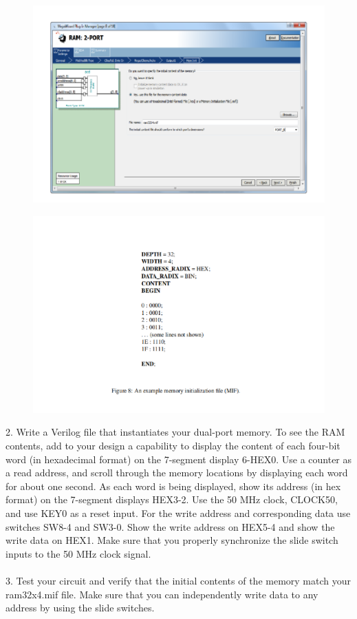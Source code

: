 \begin{figure}[h]
    \centering
    \includegraphics[scale = 0.4]{source/picture/Lab8/bai8_minhhoa3.png}
\end{figure}
\newpage
\begin{figure}[h]
    \centering
    \includegraphics[scale = 0.5]{source/picture/Lab8/bai8_minhhoa4.png}
\end{figure}
2. Write a Verilog file that instantiates your dual-port memory. To see the RAM contents, add to your design a capability to display the content of each four-bit word (in hexadecimal format) on the 7-segment display 6-HEX0. Use a counter as a read address, and scroll through the memory locations by displaying each word for about one second. As each word is being displayed, show its address (in hex format) on the 7-segment displays HEX3-2. Use the 50 MHz clock, CLOCK50, and use KEY0 as a reset input. For the write address and corresponding data use switches SW8-4 and SW3-0. Show the write address on HEX5-4 and show the write data on HEX1. Make sure that you properly synchronize the slide switch inputs to the 50 MHz clock signal.\\
\\
3. Test your circuit and verify that the initial contents of the memory match your ram32x4.mif file. Make sure
that you can independently write data to any address by using the slide switches.\\

